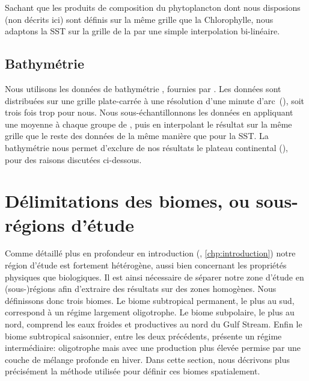 Sachant que les produits de composition du phytoplancton dont nous disposions (non décrits ici) sont définis sur la même grille que la Chlorophylle, nous adaptons la SST sur la grille de la  par une simple interpolation bi-linéaire.

\subsection{Bathymétrie}
\label{sec:donnees-bathymetrie}

Nous utilisons les données de bathymétrie , fournies par .
Les données sont distribuées sur une grille plate-carrée à une résolution d'une minute d'arc~(), soit trois fois trop pour nous.
Nous sous-échantillonnons les données en appliquant une moyenne à chaque groupe de , puis en interpolant le résultat sur la même grille que le reste des données de la même manière que pour la SST.
La bathymétrie nous permet d'exclure de nos résultats le plateau continental (), pour des raisons discutées ci-dessous.

\begin{figure}
  \centering
  \label{fig:bathymetrie}
\end{figure}

\section{Délimitations des biomes, ou sous-régions d'étude}
\label{sec:delimitations-regions}

Comme détaillé plus en profondeur en introduction (, \cref*{chp:introduction}) notre région d'étude est fortement hétérogène, aussi bien concernant les propriétés physiques que biologiques.
Il est ainsi nécessaire de séparer notre zone d'étude en (sous-)régions afin d'extraire des résultats sur des zones homogènes.
Nous définissons donc trois biomes.
Le biome subtropical permanent, le plus au sud, correspond à un régime largement oligotrophe.
Le biome subpolaire, le plus au nord, comprend les eaux froides et productives au nord du Gulf Stream.
Enfin le biome subtropical saisonnier, entre les deux précédents, présente un régime intermédiaire: oligotrophe mais avec une production plus élevée permise par une couche de mélange profonde en hiver.
Dans cette section, nous décrivons plus précisément la méthode utilisée pour définir ces biomes spatialement.


